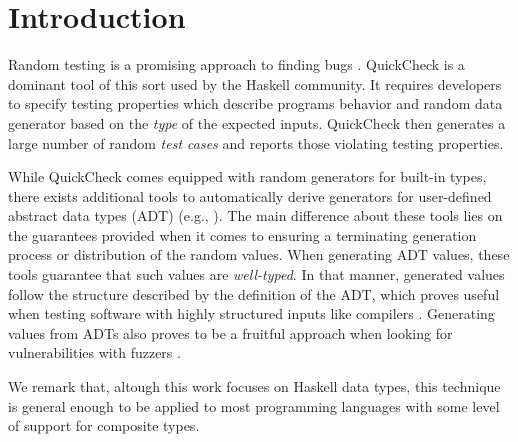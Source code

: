 \section{Introduction}

Random testing is a promising approach to finding bugs {\tocite}.
%
QuickCheck \cite{ClaessenH00} is a dominant tool of this sort used by the
Haskell community.
%
It requires developers to specify testing properties which describe programs
behavior and random data generator based on the \emph{type} of the expected
inputs. %
%
QuickCheck then generates a large number of random \emph{test cases} and reports
those violating testing properties.
%

While QuickCheck comes equipped with random generators for built-in types, there
exists additional tools to automatically derive generators for user-defined
abstract data types (ADT) (e.g.,
\cite{mitchell2007,RuncimanNL08,DuregardJW12,grieco2017,DBLP:conf/haskell/MistaRH18}).
%
The main difference about these tools lies on the guarantees provided when it
comes to ensuring a terminating generation process or distribution of the random
values.
%
When generating ADT values, these tools guarantee that such values are
\emph{well-typed}.
%
In that manner, generated values follow the structure described by the
definition of the ADT, which proves useful when testing software with highly
structured inputs like compilers \cite{Palka11,MidtgaardJKNN17}.
%
Generating values from ADTs also proves to be a fruitful approach when looking
for vulnerabilities with fuzzers \cite{GriecoCB16,grieco2017}.
%




We remark that, altough this work focuses on Haskell data types, this technique
is general enough to be applied to most programming languages with some level of
support for composite types.


